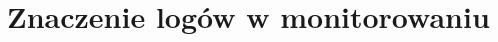 \chapter[Znaczenie logów]{Znaczenie logów w monitorowaniu}
\label{chapter:logs}

\clearpage 
\clearpage 
\clearpage 
\clearpage 
\clearpage 